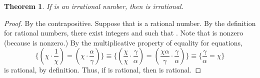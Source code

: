 \documentclass[preview]{standalone}
\newtheorem{theorem}{Theorem}
\begin{document}
\begin{theorem} %
    If \bm{$\chi$} is an irrational number, 
    then  is irrational.
\end{theorem}

\begin{proof}
    By the contrapositive. 
    Suppose that  is a rational number. 
    By the definition for rational numbers, 
    there exist integers \bm{$\alpha$} and \bm{$\gamma$} such that 
    . 
    Note that \bm{$\alpha$} is nonzero (because  is nonzero.) 
    By the multiplicative property of equality for equations,
    \begin{equation*}
        \Bigg\{
            \left(
                \chi \cdot \frac{1}{\chi}
            \right) 
                = 
            \left(
                \chi \cdot \frac{\alpha}{\gamma}
            \right)
        \Bigg\} 
            \equiv
        \Bigg\{
            \left(
                \frac{\chi}{\chi} \cdot \frac{\gamma}{\alpha}
            \right) 
                = 
            \left(
                \frac{\chi \alpha}{\gamma} \cdot \frac{\gamma}{\alpha}
            \right)
        \Bigg\} 
            \equiv
        \Bigg\{
            \frac{\gamma}{\alpha} 
                = 
            \chi
        \Bigg\}
    \end{equation*}
    \bm{$\frac{\gamma}{\alpha} = \chi$} is rational, 
    by definition. 
    Thus, if  is rational, 
    then \bm{$\chi$} is rational.
\end{proof}
\end{document}

